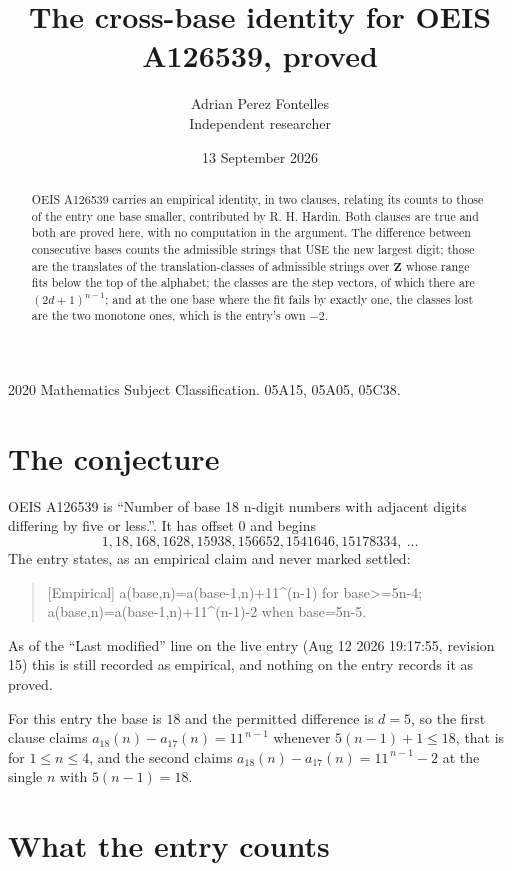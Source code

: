 \documentclass[11pt,a4paper]{article}
\title{The cross-base identity for OEIS A126539, proved}
\author{Adrian Perez Fontelles\\ \small Independent researcher}
\date{13 September 2026}
\theoremstyle{plain}
\theoremstyle{definition}
\begin{document}
\maketitle

\begin{abstract}
OEIS A126539 carries an empirical identity, in two clauses, relating its counts to those of the
entry one base smaller, contributed by R. H. Hardin. Both clauses are true and both are proved
here, with no computation in the argument. The difference between consecutive bases counts the
admissible strings that USE the new largest digit; those are the translates of the
translation-classes of admissible strings over $\mathbf{Z}$ whose range fits below the top of
the alphabet; the classes are the step vectors, of which there are $(2d+1)^{n-1}$; and at the
one base where the fit fails by exactly one, the classes lost are the two monotone ones, which
is the entry's own $-2$.
\end{abstract}

\noindent\small 2020 Mathematics Subject Classification. 05A15, 05A05, 05C38.\normalsize

\section{The conjecture}

OEIS A126539 is ``Number of base 18 n-digit numbers with adjacent digits differing by five or less.''. It has offset $0$ and begins
\[
1, 18, 168, 1628, 15938, 156652, 1541646, 15178334,\ \dots
\]
The entry states, as an empirical claim and never marked settled:
\begin{quote}
[Empirical] a(base,n)=a(base-1,n)+11\textasciicircum{}(n-1) for base>=5n-4; a(base,n)=a(base-1,n)+11\textasciicircum{}(n-1)-2 when base=5n-5.
\end{quote}
As of the ``Last modified'' line on the live entry (Aug 12 2026 19:17:55, revision 15)
this is still recorded as empirical, and nothing on the entry records it as proved.

For this entry the base is $18$ and the permitted difference is $d=5$, so the first clause
claims $a_{18}(n)-a_{17}(n)=11^{\,n-1}$ whenever $5(n-1)+1\le18$, that is for
$1\le n\le4$, and the second claims $a_{18}(n)-a_{17}(n)=11^{\,n-1}-2$ at the single
$n$ with $5(n-1)=18$.

\section{What the entry counts}
\end{document}

